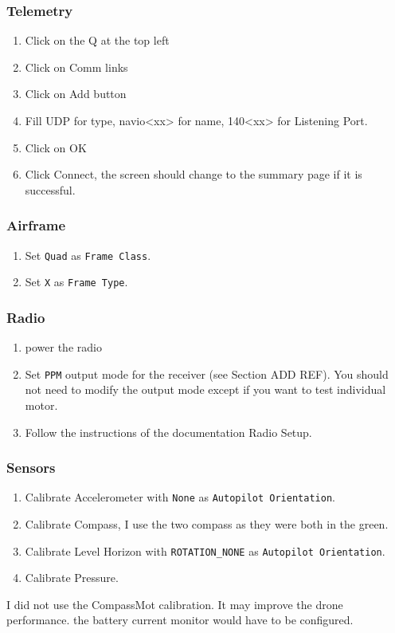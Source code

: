 \subsubsection{Telemetry}
\begin{enumerate}
    \item Click on the Q at the top left
    \item Click on Comm links
    \item Click on Add button
    \item Fill UDP for type, navio<xx> for name, 140<xx> for Listening Port.
    \item Click on OK
    \item Click Connect, the screen should change to the summary page if it is successful.
\end{enumerate}

\subsubsection{Airframe}
\begin{enumerate}
    \item Set \texttt{Quad} as \texttt{Frame Class}.
    \item Set \texttt{X} as \texttt{Frame Type}.
\end{enumerate}

\subsubsection{Radio}
\begin{enumerate}
    \item power the radio
    \item Set \texttt{PPM} output mode for the receiver (see Section ADD REF). You should not need to modify the output mode except if you want to test individual motor.
    \item Follow the instructions of the documentation Radio Setup.
\end{enumerate}

\subsubsection{Sensors}
\begin{enumerate}
    \item Calibrate Accelerometer with \texttt{None} as \texttt{Autopilot Orientation}.
    \item Calibrate Compass, I use the two compass as they were both in the green.
    \item Calibrate Level Horizon  with \texttt{ROTATION\_NONE} as \texttt{Autopilot Orientation}.
    \item Calibrate Pressure.
\end{enumerate}
I did not use the CompassMot calibration. It may improve the drone performance. the battery current monitor would have to be configured.


